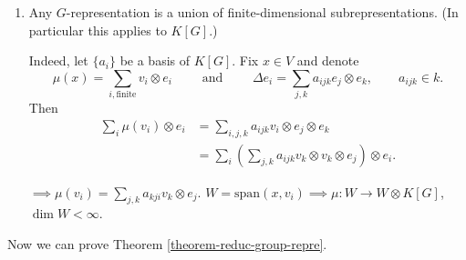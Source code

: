 \begin{enumerate}
\noindent
Equation \ref{equation-diagram} defines a
$K[G]$-comodule
structure on $K[G]$.

\item Any $G$-representation is a union
of finite-dimensional subrepresentations.
(In particular this applies to $K[G]$.)

Indeed, let $\{a_i\}$ be a basis of $K[G]$.
Fix $x \in V$ and denote
$$
\mu(x)=\sum_{i, \text{finite}} v_i \otimes
e_i
\qquad \text{ and } \qquad
\Delta e_i=\sum_{j,k}a_{ijk}e_j \otimes
e_k,\qquad
a_{ijk}\in k.
$$
Then
$$
\begin{aligned}
\sum_i\mu(v_i)\otimes e_i&=
\sum_{i,j,k}a_{i j k}v_i \otimes e_j \otimes
e_k\\
&=\sum_i\left(\sum_{j,k}
a_{i j k}v_k \otimes v_k \otimes e_j \right)
\otimes e_i.
\end{aligned}
$$

\noindent
$\implies \mu(v_i)=\sum_{j,k}a_{k j i}v_k
\otimes e_j$.
$W=\text{span}(x,v_i)\implies \mu:W \to W
\otimes K[G]$,
$\dim W < \infty$.
\end{enumerate}

Now we can prove Theorem
\ref{theorem-reduc-group-repre}.

